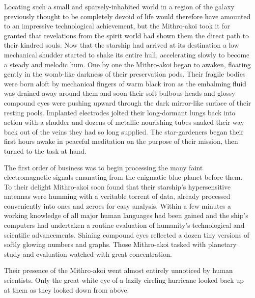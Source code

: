 \documentclass[12pt]{article}
\begin{document}
Locating such a small and sparsely-inhabited world in a region of the galaxy previously thought to be completely devoid of life would therefore have amounted to an impressive technological achievement, 
but the Mithro-akoi took it for granted that revelations from the spirit world had shown them the direct path to their kindred souls.
Now that the starship had arrived at its destination a low mechanical shudder started to shake its entire hull,
accelerating slowly to become a steady and melodic hum.
One by one the Mithro-akoi began to awaken,
floating gently in the womb-like darkness of their preservation pods.
Their fragile bodies were born aloft by mechanical fingers of warm black iron as the embalming fluid was drained away around them and soon their soft bulbous heads and glossy compound eyes were pushing upward through the dark mirror-like surface of their resting pools.
Implanted electrodes jolted their long-dormant lungs back into action with a shudder and dozens of metallic nourishing tubes snaked their way back out of the veins they had so long supplied.
The star-gardeners began their first hours awake in peaceful meditation on the purpose of their mission,
then turned to the task at hand.

The first order of business was to begin processing the many faint electromagnetic signals emanating from the enigmatic blue planet before them.
To their delight Mithro-akoi soon found that their starship's hypersensitive antennas were humming with a veritable torrent of data,
already processed conveniently into ones and zeroes for easy analysis.
Within a few minutes a working knowledge of all major human languages had been gained and the ship's computers had undertaken a routine evaluation of humanity's technological and scientific advancements.
Shining compound eyes reflected a dozen tiny versions of softly glowing numbers and graphs. 
Those Mithro-akoi tasked with planetary study and evaluation watched with great concentration.

Their presence of the Mithro-akoi went almost entirely unnoticed by human scientists.
Only the great white eye of a lazily circling hurricane looked back up at them as they looked down from above.
\end{document}
